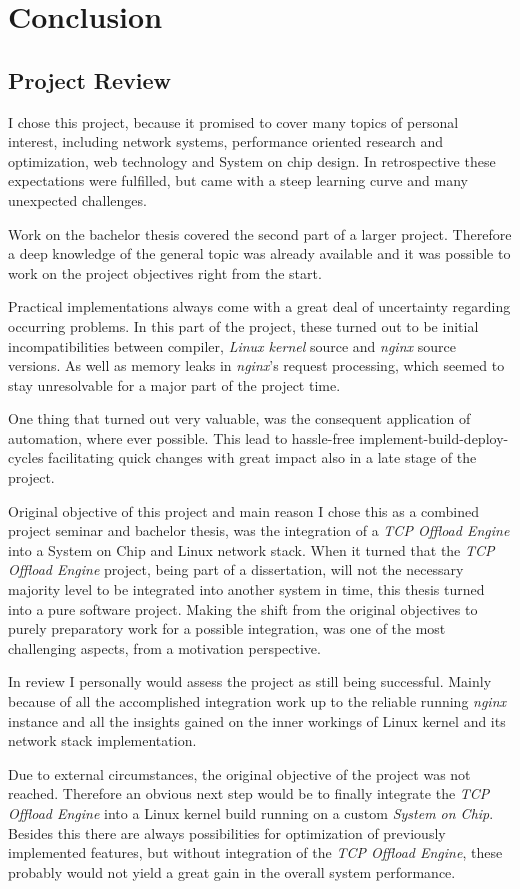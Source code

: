 \chapter{Conclusion}

\section{Project Review}

I chose this project, because it promised to cover many topics of personal interest, including network systems, performance oriented research and optimization, web technology and System on chip design. In retrospective these expectations were fulfilled, but came with a steep learning curve and many unexpected challenges.

Work on the bachelor thesis covered the second part of a larger project. Therefore a deep knowledge of the general topic was already available and it was possible to work on the project objectives right from the start.

Practical implementations always come with a great deal of uncertainty regarding occurring problems. In this part of the project, these turned out to be initial incompatibilities between compiler, \textit{Linux kernel} source and \textit{nginx} source versions. As well as memory leaks in \textit{nginx}'s request processing, which seemed to stay unresolvable for a major part of the project time.

One thing that turned out very valuable, was the consequent application of automation, where ever possible. This lead to hassle-free implement-build-deploy-cycles facilitating quick changes with great impact also in a late stage of the project.

Original objective of this project and main reason I chose this as a combined project seminar and bachelor thesis, was the integration of a \textit{TCP Offload Engine} into a System on Chip and Linux network stack. When it turned that the \textit{TCP Offload Engine} project, being part of a dissertation, will not the necessary majority level to be integrated into another system in time, this thesis turned into a pure software project. Making the shift from the original objectives to purely preparatory work for a possible integration, was one of the most challenging aspects, from a motivation perspective. 

In review I personally would assess the project as still being successful. Mainly because of all the accomplished integration work up to the reliable running \textit{nginx} instance and all the insights gained on the inner workings of Linux kernel and its network stack implementation.

Due to external circumstances, the original objective of the project was not reached. Therefore an obvious next step would be to finally integrate the \textit{TCP Offload Engine} into a Linux kernel build running on a custom \textit{System on Chip}. Besides this there are always possibilities for optimization of previously implemented features, but without integration of the \textit{TCP Offload Engine}, these probably would not yield a great gain in the overall system performance.